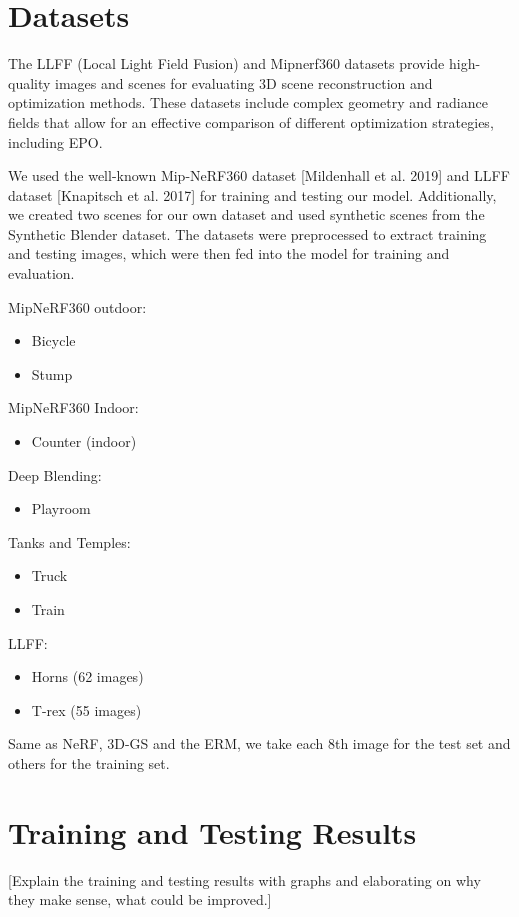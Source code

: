 \documentclass[11pt]{report}
\begin{document}
\section{Datasets}
The LLFF (Local Light Field Fusion) and Mipnerf360 datasets provide high-quality images and scenes for evaluating 3D scene reconstruction and optimization methods. These datasets include complex geometry and radiance fields that allow for an effective comparison of different optimization strategies, including EPO.

We used the well-known Mip-NeRF360 dataset [Mildenhall et al. 2019] and LLFF dataset [Knapitsch et al. 2017] for training and testing our model. Additionally, we created two scenes for our own dataset and used synthetic scenes from the Synthetic Blender dataset. The datasets were preprocessed to extract training and testing images, which were then fed into the model for training and evaluation.

MipNeRF360 outdoor:
\begin{itemize}
    \item Bicycle 
    \item Stump
\end{itemize}

MipNeRF360 Indoor:
\begin{itemize}
    \item Counter (indoor)
\end{itemize}

Deep Blending:
\begin{itemize}
    \item Playroom
\end{itemize}

Tanks and Temples:
\begin{itemize}
    \item Truck
    \item Train
\end{itemize}

LLFF:
\begin{itemize}
    \item Horns (62 images)
    \item T-rex (55 images)
\end{itemize}

Same as NeRF, 3D-GS and the ERM, we take each 8th image for the test set and others for the training set.

\section{Training and Testing Results}
[Explain the training and testing results with graphs and elaborating on why they make sense, what could be improved.]
\end{document}

